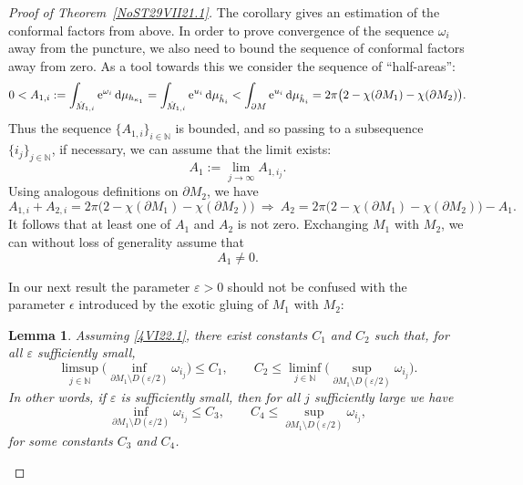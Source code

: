 \documentclass[pdftex]{sigma}
\numberwithin{equation}{section}
\newtheorem{Lemma}[Theorem]{Lemma}
\newcommand{\hhi}{{\red{\hat h_{i}}}}
\newcommand{\zMone}{\red{{\hat M}_{1,i}}}
\newcommand{\repsilon}{ {\varepsilon}}
\newcommand{\red}[1]{{\color{red}#1}}
\newcommand{\N}{\mathbb N}
\newcommand{\mv}{\omega}%
\renewcommand{\red}[1]{#1}
\begin{document}
\begin{proof}[Proof of Theorem~\ref{NoST29VII21.1}]
The corollary gives an estimation of the conformal factors from above. In order to prove convergence of the sequence $\mv_i$ away from the puncture, we also need to bound the sequence of conformal factors away from zero. As a tool towards this we
consider the sequence of ``half-areas'':
\begin{equation*}%
 0 < A_{1,i}:=\int_{\zMone } {\rm e}^{\mv_i} \,{\rm d}\mu_{h_{\kappa_1}} =
 \int_{\zMone } {\rm e}^{u_i} \,{\rm d}\mu_{\hhi }
 <
 \int_{\partial M } {\rm e}^{u_i} \,{\rm d}\mu_{\hhi }
 = \red{2\pi}
 \big(
 2-\chi(\partial M_1) - \chi(\partial M_2)
 \big).
\end{equation*}
Thus the sequence $\{A_{1,i}\}_{i\in \N}$ is bounded, and so passing to a subsequence $\{i_j\}_{j\in \N}$, if necessary, we can assume that the limit exists:
\begin{equation*}%
 A_{1}:= \lim_{j\to\infty} A_{1,i_j}.
\end{equation*}
Using analogous definitions on $\partial M_2$, we have
\begin{equation*}%
 A_{1,i} + A_{2,i} = \red{2\pi}
 \big(
 2-\chi(\partial M_1) - \chi(\partial M_2)
 \big)
 \
 \Longrightarrow
 \
 A_2 = \red{2\pi}
 \big(
 2-\chi(\partial M_1) - \chi(\partial M_2)
 \big) - A_1.
\end{equation*}
It follows that at least one of $A_1$ and $A_2$ is not zero. Exchanging $M_1$ with $M_2$, we can without loss of generality assume that
\begin{equation}\label{4VI22.1}
 A_1 \ne 0.
\end{equation}

In our next result the parameter $\repsilon>0$ should not be confused with the parameter $\epsilon$ introduced by the exotic gluing of $M_1$ with $M_2$:

\begin{Lemma}\label{NoSL23X21.1}Assuming \eqref{4VI22.1}, there exist constants $C_1$ and $C_2$ such that, for all $\repsilon$ sufficiently small,
\begin{equation*}%
 \limsup_{j\in \N}
 \Big(
 \inf_{\red{\partial M_1 \setminus D(\repsilon/2)}} \mv_{i_j}
 \Big)
 \le C_1,
 \qquad
 C_2\le
 \liminf_{j\in\N}
 \Big(
 \sup_{\red{\partial M_1 \setminus D(\repsilon/2)}} \mv_{i_j}
 \Big).
\end{equation*}
In other words, if $\repsilon$ is sufficiently small, then for all $j$ sufficiently large we have
\begin{equation}\label{NoS15VIII21.21b}
 \inf_{\red{\partial M_1 \setminus D(\repsilon/2)}} \mv_{i_j}
 \le C_3,
 \qquad
 C_4\le
 \sup_{\red{\partial M_1 \setminus D(\repsilon/2)}} \mv_{i_j},
\end{equation}
for some constants $C_3$ and $C_4$.
\end{Lemma}


\end{proof}
\end{document}
